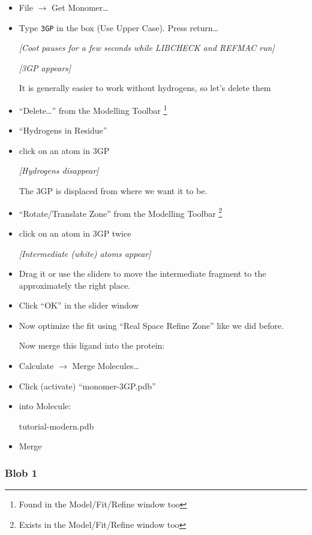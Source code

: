 \documentclass{article}
\begin{document}
\begin{itemize}
\item \textsf{File $\rightarrow$ Get Monomer\ldots}
\item Type \texttt{3GP} in the box (Use Upper Case).  Press return\ldots

\textsl{ [Coot pauses for a few seconds while LIBCHECK and REFMAC run]}

\textsl{ [3GP appears]}

It is generally easier to work without hydrogens, so let's delete
them

\item \textsf{``Delete\ldots''} from the Modelling Toolbar
  \footnote{Found in the Model/Fit/Refine window too}
\item \textsf{``Hydrogens in Residue''}
\item click on an atom in 3GP

\textsl{ [Hydrogens disappear]}

The 3GP is displaced from where we want it to be.

\item \textsf{``Rotate/Translate Zone''} from the Modelling Toolbar
\footnote{Exists in the Model/Fit/Refine window too}
\item click on an atom in 3GP twice

\textsl{ [Intermediate (white) atoms appear]}

\item Drag it or use the sliders to move the intermediate fragment to
  the approximately the right place.
\item Click \textsf{``OK''} in the slider window
\item Now optimize the fit using ``Real Space Refine Zone'' like we did
  before.

Now merge this ligand into the protein:
\item \textsf{Calculate $\rightarrow$ Merge Molecules\ldots}
\item Click (activate) ``monomer-3GP.pdb''
\item into Molecule:
  
  \textsf{tutorial-modern.pdb}

\item \textsf{Merge}

\end{itemize}

\subsubsection{Blob 1}
\end{document}
